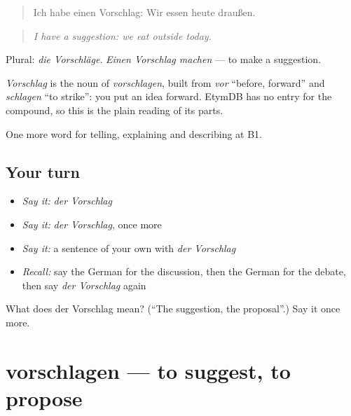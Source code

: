 \begin{quote}
Ich habe einen Vorschlag: Wir essen heute draußen.
\end{quote}

\begin{quote}
\emph{I have a suggestion: we eat outside today.}
\end{quote}

Plural: \emph{die Vorschläge}. \emph{Einen Vorschlag machen} — to make a suggestion.

\begin{cousinweb}
\emph{Vorschlag} is the noun of \emph{vorschlagen}, built from \emph{vor} \textquotedblleft{}before, forward\textquotedblright{} and \emph{schlagen} \textquotedblleft{}to strike\textquotedblright{}: you put an idea forward. EtymDB has no entry for the compound, so this is the plain reading of its parts.
\end{cousinweb}

\begin{grammarlens}[title={What you've built}]
One more word for telling, explaining and describing at B1.
\end{grammarlens}

\subsection*{Your turn}
\begin{itemize}
\raggedright
  \item \emph{Say it:} \emph{der Vorschlag}
  \item \emph{Say it:} \emph{der Vorschlag}, once more
  \item \emph{Say it:} a sentence of your own with \emph{der Vorschlag}
  \item \emph{Recall:} say the German for the discussion, then the German for the debate, then say \emph{der Vorschlag} again
\end{itemize}

\begin{tcolorbox}[breakable,colback=teal!4,colframe=teal!35!black,title={Before you move on}]
What does der Vorschlag mean? (\textquotedblleft{}The suggestion, the proposal\textquotedblright{}.) Say it once more.
\end{tcolorbox}
\section[vorschlagen]{vorschlagen — to suggest, to propose}

